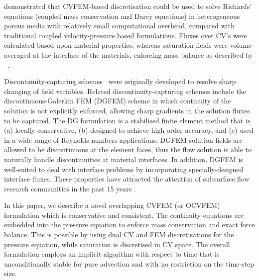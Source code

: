 \documentclass[preprint,authoryear,12pt]{elsarticle}
\begin{document}
\citet{cumming_2011} demonstrated that CVFEM-based discretisation could be used to solve Richards' equations (coupled mass conservation and Darcy equations) in heterogeneous porous media with relatively small computational overhead, compared with traditional coupled velocity-pressure based formulations. Fluxes over CV's were calculated based upon material properties, whereas saturation fields were volume-averaged at the interface of the materials, enforcing mass balance as described by \citet{kirkland_1992}~\citep[see also][]{forsyth_1990,cumming_phd2012}.

\medskip

Discontinuity-capturing schemes~\citep[e.g., shock waves, contact surface or material discontinuity -- see][]{brooks_1982,tezduyar_1986} were originally developed to resolve sharp changing of field variables. Related discontinuity-capturing schemes include the discontinuous-Galerkin FEM (DGFEM) scheme in which continuity of the solution is not explicitly enforced, allowing sharp gradients in the solution fluxes to be captured. The DG formulation is a stabilised finite element method that is (a) locally conservative, (b) designed to achieve high-order accuracy, and (c) used in a wide range of Reynolds numbers applications. DGFEM solution fields are allowed to be discontinuous at the element faces, thus the flow solution is able to naturally handle discontinuities at material interfaces. In addition, DGFEM is well-suited to deal with interface problems by incorporating specially-designed interface fluxes. These properties have attracted the attention of subsurface flow research communities in the past 15 years \citep[see][]{riviere_2000,riviere_2002,bastian_2002}.

\medskip 

In this paper, we describe a novel overlapping CVFEM (or OCVFEM) formulation which is conservative and consistent. The continuity equations are embedded into the pressure equation to enforce mass conservation and exact force balance. This is possible by using dual CV and FEM discretisations for the pressure equation, while saturation is discretised in CV space. The overall formulation employs an implicit algorithm with respect to time that is unconditionally stable for pure advection and with no restriction on the time-step size.
\end{document}
